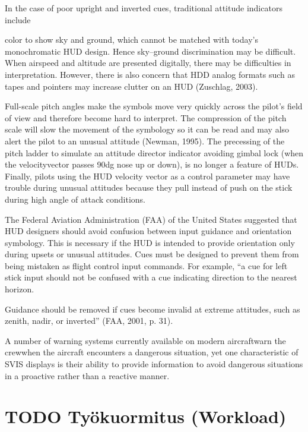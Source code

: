 \documentclass[utf8,bachelor,manualbib]{gradu3}
\begin{document}
In the case of poor upright and inverted cues, traditional attitude indicators include

color to show sky and ground, which cannot be matched with today’s monochromatic
HUD design. Hence sky–ground discrimination may be difficult. When
airspeed and altitude are presented digitally, there may be difficulties in interpretation.
However, there is also concern that HDD analog formats such as tapes and
pointers may increase clutter on an HUD (Zuschlag, 2003).


Full-scale pitch angles make the symbols move very quickly across the pilot’s
field of view and therefore become hard to interpret. The compression of the pitch
scale will slow the movement of the symbology so it can be read and may also alert
the pilot to an unusual attitude (Newman, 1995). The precessing of the pitch ladder
to simulate an attitude director indicator avoiding gimbal lock (when the velocityvector passes 90dg nose up or down), is no longer a feature of HUDs. Finally, pilots
using the HUD velocity vector as a control parameter may have trouble during unusual
attitudes because they pull instead of push on the stick during high angle of
attack conditions.

The Federal Aviation Administration (FAA) of the United States suggested that
HUD designers should avoid confusion between input guidance and orientation
symbology. This is necessary if the HUD is intended to provide orientation only
during upsets or unusual attitudes. Cues must be designed to prevent them from
being mistaken as flight control input commands. For example, “a cue for left stick
input should not be confused with a cue indicating direction to the nearest horizon.

Guidance should be removed if cues become invalid at extreme attitudes, such as
zenith, nadir, or inverted” (FAA, 2001, p. 31).\citep{crawfordneal2006}


A number of
warning systems currently available on modern aircraftwarn the crewwhen the aircraft
encounters a dangerous situation, yet one characteristic of SVIS displays is
their ability to provide information to avoid dangerous situations in a proactive
rather than a reactive manner. \citep{schnell2004}





\section{TODO Työkuormitus (Workload)}
\end{document}
